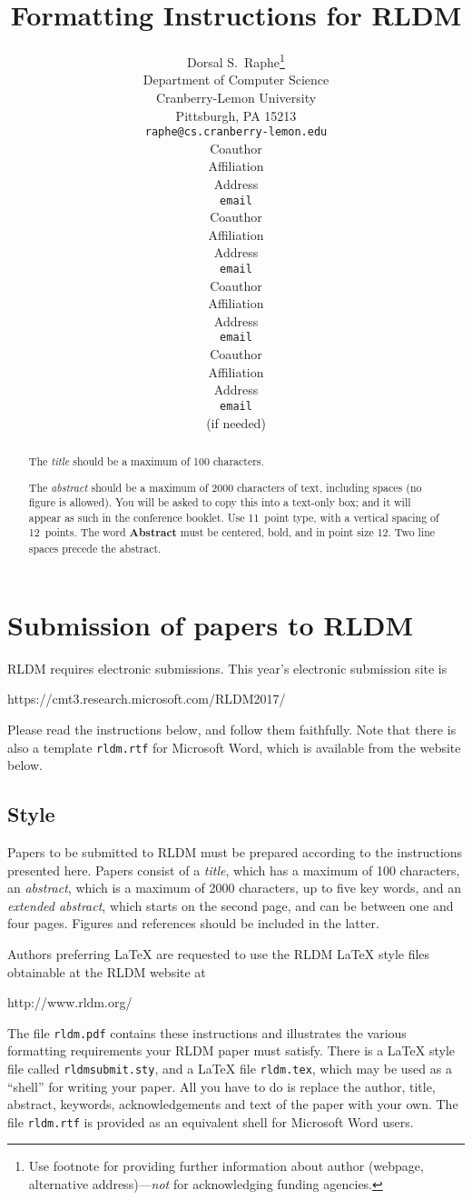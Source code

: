 \documentclass[11pt]{article} %
\title{Formatting Instructions for RLDM}
\author{
Dorsal S.~Raphe\thanks{ Use footnote for providing further information
about author (webpage, alternative address)---\emph{not} for acknowledging
funding agencies.} \\
Department of Computer Science\\
Cranberry-Lemon University\\
Pittsburgh, PA 15213 \\
\texttt{raphe@cs.cranberry-lemon.edu} \\
\And
Coauthor \\
Affiliation \\
Address \\
\texttt{email} \\
\AND
Coauthor \\
Affiliation \\
Address \\
\texttt{email} \\
\And
Coauthor \\
Affiliation \\
Address \\
\texttt{email} \\
\And
Coauthor \\
Affiliation \\
Address \\
\texttt{email} \\
(if needed)\\
}
\begin{document}
\maketitle

\begin{abstract}
The \emph{title} should be a maximum of 100 characters. 

The \emph{abstract} should be a maximum of 2000 characters of text,
including spaces (no figure is allowed). You will be asked to copy
this into a text-only box; and it will appear as such in the
conference booklet. Use 11~point type, with a vertical spacing of
12~points.  The word \textbf{Abstract} must be centered, bold, and in
point size 12. Two line spaces precede the abstract.
\end{abstract}




\startmain %

\section{Submission of papers to RLDM}

RLDM requires electronic submissions.  This year's electronic
submission site is   
\begin{center}
   https://cmt3.research.microsoft.com/RLDM2017/
\end{center}

Please read the instructions below, and follow them faithfully. Note
that there is also a template \verb+rldm.rtf+ for Microsoft Word,
which is available from the website below.
\subsection{Style}

Papers to be submitted to RLDM must be prepared according to the
instructions presented here. Papers consist of a \emph{title}, which
has a maximum of 100 characters, an \emph{abstract}, which is a
maximum of 2000 characters, up to five key words, and an
\emph{extended abstract}, which starts on the second page, and can be
between one and four pages. Figures and references should be included
in the latter.

Authors preferring \LaTeX{} are requested to use the RLDM \LaTeX{}
style files obtainable at the RLDM website at
\begin{center}
   http://www.rldm.org/
\end{center}
The file \verb+rldm.pdf+ contains these instructions and illustrates
the various formatting requirements your RLDM paper must
satisfy. There is a \LaTeX{} style file called \verb+rldmsubmit.sty+,
and a \LaTeX{} file \verb+rldm.tex+, which may be used as a ``shell''
for writing your paper. All you have to do is replace the author,
title, abstract, keywords, acknowledgements and text of the paper with
your own. The file
\verb+rldm.rtf+ is provided as an equivalent shell for Microsoft Word users. 
\end{document}
